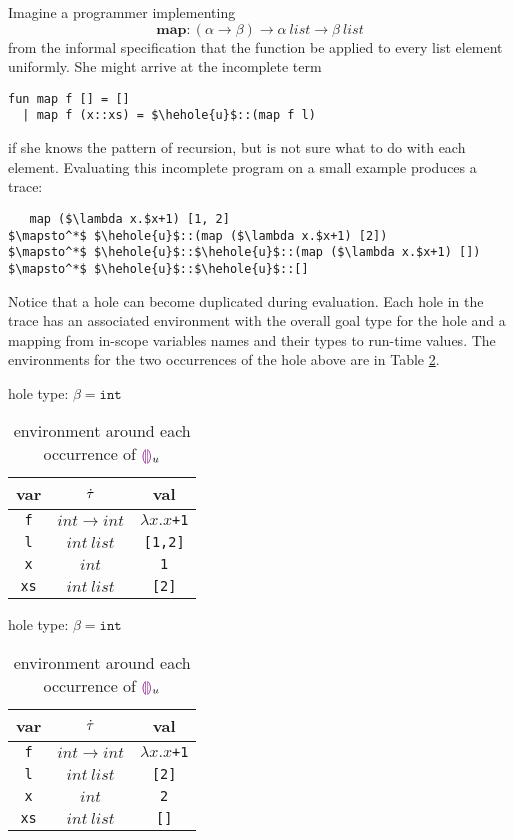 Imagine a programmer implementing $$\mathbf{map} : (\alpha \to \beta) \to
\alpha ~\mathit{list} \to \beta ~\mathit{list}$$ from the informal
specification that the function be applied to every list element uniformly.
She might arrive at the incomplete term
\begin{lstlisting}
fun map f [] = []
  | map f (x::xs) = $\hehole{u}$::(map f l)
\end{lstlisting}
if she knows the pattern of recursion, but is not sure what to do with each
element. Evaluating this incomplete program on a small example produces a
trace:
\begin{lstlisting}
   map ($\lambda x.$x+1) [1, 2]
$\mapsto^*$ $\hehole{u}$::(map ($\lambda x.$x+1) [2])
$\mapsto^*$ $\hehole{u}$::$\hehole{u}$::(map ($\lambda x.$x+1) [])
$\mapsto^*$ $\hehole{u}$::$\hehole{u}$::[]
\end{lstlisting}
Notice that a hole can become duplicated during evaluation. Each hole in
the trace has an associated environment with the overall goal type for the
hole and a mapping from in-scope variables names and their types to
run-time values. The environments for the two occurrences of the hole above
are in Table \ref{tabx}.

\begin{table}[h!]
  \begin{subtable}{.5\linewidth}
    \caption{hole type: $\beta=\texttt{int}$}
    \centering
        {
          \footnotesize
          \begin{tabular}{c|c|c}
            var & $\dot{\tau}$ & val\\
            \hline
            \texttt{f} & $int \to int$ & $\lambda x.x$\texttt{+1}\\
            \texttt{l} & $int ~list$ & \texttt{[1,2]}\\
            \texttt{x} & $int$ & \texttt{1}\\
            \texttt{xs} & $int ~list$ & \texttt{[2]}\\
          \end{tabular}
        }
  \end{subtable}%
  \begin{subtable}{.5\linewidth}
    \caption{hole type: $\beta=\texttt{int}$}
    \centering
        {
          \footnotesize
          \begin{tabular}{c|c|c}
            var & $\dot{\tau}$ & val\\
            \hline
            \texttt{f} & $int \to int$ & $\lambda x.x$\texttt{+1}\\
            \texttt{l} & $int ~list$ & \texttt{[2]}\\
            \texttt{x} & $int$ & \texttt{2}\\
            \texttt{xs} & $int ~list$ & \texttt{[]}\\
          \end{tabular}
        }
  \end{subtable}
  \caption{environment around each occurrence of $\textcolor{violet}{\llparenthesis}\textcolor{violet}{\rrparenthesis}_{u}$}
  \label{tabx}
\end{table}


